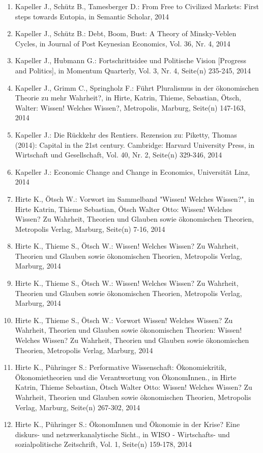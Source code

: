 \begin{enumerate}
	 \item Kapeller J., Schütz B., Tamesberger D.: From Free to Civilized Markets: First steps towards Eutopia, in Semantic Scholar, 2014
	 \item Kapeller J., Schütz B.: Debt, Boom, Bust: A Theory of Minsky-Veblen Cycles, in Journal of Post Keynesian Economics, Vol. 36, Nr. 4, 2014
	 \item Kapeller J., Hubmann G.: Fortschrittsidee und Politische Vision [Progress and Politics], in Momentum Quarterly, Vol. 3, Nr. 4, Seite(n) 235-245, 2014
	 \item Kapeller J., Grimm C., Springholz F.: Führt Pluralismus in der ökonomischen Theorie zu mehr Wahrheit?, in Hirte, Katrin, Thieme, Sebastian, Ötsch, Walter: Wissen! Welches Wissen?, Metropolis, Marburg, Seite(n) 147-163, 2014
	 \item Kapeller J.: Die Rückkehr des Rentiers. Rezension zu: Piketty, Thomas (2014): Capital in the 21st century. Cambridge: Harvard University Press, in Wirtschaft und Gesellschaft, Vol. 40, Nr. 2, Seite(n) 329-346, 2014
	 \item Kapeller J.: Economic Change and Change in Economics, Universität Linz, 2014
	 \item Hirte K., Ötsch W.: Vorwort im Sammelband "Wissen! Welches Wissen?", in Hirte Katrin, Thieme Sebastian, Ötsch Walter Otto: Wissen! Welches Wissen? Zu Wahrheit, Theorien und Glauben sowie ökonomischen Theorien, Metropolis Verlag, Marburg, Seite(n) 7-16, 2014
	 \item Hirte K., Thieme S., Ötsch W.: Wissen! Welches Wissen? Zu Wahrheit, Theorien und Glauben sowie ökonomischen Theorien, Metropolis Verlag, Marburg, 2014
	 \item Hirte K., Thieme S., Ötsch W.: Wissen! Welches Wissen? Zu Wahrheit, Theorien und Glauben sowie ökonomischen Theorien, Metropolis Verlag, Marburg, 2014
	 \item Hirte K., Thieme S., Ötsch W.: Vorwort Wissen! Welches Wissen? Zu Wahrheit, Theorien und Glauben sowie ökonomischen Theorien: Wissen! Welches Wissen? Zu Wahrheit, Theorien und Glauben sowie ökonomischen Theorien, Metropolis Verlag, Marburg, 2014
	 \item Hirte K., Pühringer S.: Performative Wissenschaft: Ökonomiekritik, Ökonomietheorien und die Verantwortung von ÖkonomInnen., in Hirte Katrin, Thieme Sebastian, Ötsch Walter Otto: Wissen! Welches Wissen? Zu Wahrheit, Theorien und Glauben sowie ökonomischen Theorien, Metropolis Verlag, Marburg, Seite(n) 267-302, 2014
	 \item Hirte K., Pühringer S.: ÖkonomInnen und Ökonomie in der Krise? Eine diskurs- und netzwerkanalytische Sicht., in WISO - Wirtschafts- und sozialpolitische Zeitschrift, Vol. 1, Seite(n) 159-178, 2014

\end{enumerate}
